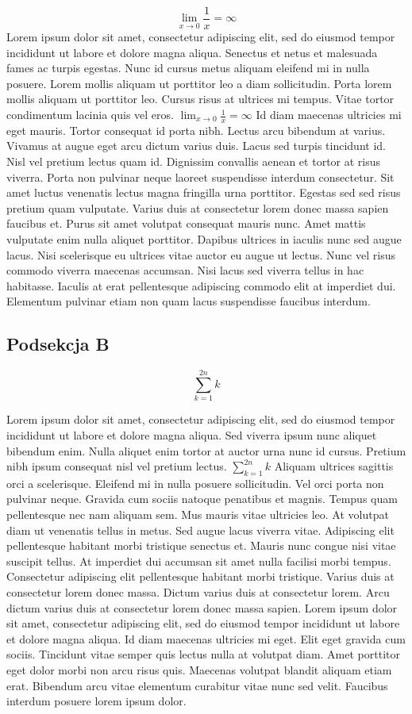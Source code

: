 \documentclass[12pt]{article}
\begin{document}
$$\lim_{x \to 0} \frac{1}{x} = \infty $$
Lorem ipsum dolor sit amet, consectetur adipiscing elit, sed do eiusmod tempor incididunt ut labore et dolore magna aliqua. Senectus et netus et malesuada fames ac turpis egestas. Nunc id cursus metus aliquam eleifend mi in nulla posuere. Lorem mollis aliquam ut porttitor leo a diam sollicitudin. Porta lorem mollis aliquam ut porttitor leo. Cursus risus at ultrices mi tempus. Vitae tortor condimentum lacinia quis vel eros. $\lim_{x \to 0} \frac{1}{x} = \infty $ Id diam maecenas ultricies mi eget mauris. Tortor consequat id porta nibh. Lectus arcu bibendum at varius. Vivamus at augue eget arcu dictum varius duis. Lacus sed turpis tincidunt id. Nisl vel pretium lectus quam id. Dignissim convallis aenean et tortor at risus viverra. Porta non pulvinar neque laoreet suspendisse interdum consectetur. Sit amet luctus venenatis lectus magna fringilla urna porttitor. Egestas sed sed risus pretium quam vulputate. Varius duis at consectetur lorem donec massa sapien faucibus et. Purus sit amet volutpat consequat mauris nunc. Amet mattis vulputate enim nulla aliquet porttitor. Dapibus ultrices in iaculis nunc sed augue lacus. Nisi scelerisque eu ultrices vitae auctor eu augue ut lectus. Nunc vel risus commodo viverra maecenas accumsan. Nisi lacus sed viverra tellus in hac habitasse. Iaculis at erat pellentesque adipiscing commodo elit at imperdiet dui. Elementum pulvinar etiam non quam lacus suspendisse faucibus interdum.


\subsection{Podsekcja B}
$$\sum_{k=1}^{2n} k $$

Lorem ipsum dolor sit amet, consectetur adipiscing elit, sed do eiusmod tempor incididunt ut labore et dolore magna aliqua. Sed viverra ipsum nunc aliquet bibendum enim. Nulla aliquet enim tortor at auctor urna nunc id cursus. Pretium nibh ipsum consequat nisl vel pretium lectus. $\sum_{k=1}^{2n} k $ Aliquam ultrices sagittis orci a scelerisque. Eleifend mi in nulla posuere sollicitudin. Vel orci porta non pulvinar neque. Gravida cum sociis natoque penatibus et magnis. Tempus quam pellentesque nec nam aliquam sem. Mus mauris vitae ultricies leo. At volutpat diam ut venenatis tellus in metus. Sed augue lacus viverra vitae. Adipiscing elit pellentesque habitant morbi tristique senectus et. Mauris nunc congue nisi vitae suscipit tellus. At imperdiet dui accumsan sit amet nulla facilisi morbi tempus. Consectetur adipiscing elit pellentesque habitant morbi tristique. Varius duis at consectetur lorem donec massa. Dictum varius duis at consectetur lorem. Arcu dictum varius duis at consectetur lorem donec massa sapien. Lorem ipsum dolor sit amet, consectetur adipiscing elit, sed do eiusmod tempor incididunt ut labore et dolore magna aliqua. Id diam maecenas ultricies mi eget. Elit eget gravida cum sociis. Tincidunt vitae semper quis lectus nulla at volutpat diam. Amet porttitor eget dolor morbi non arcu risus quis. Maecenas volutpat blandit aliquam etiam erat. Bibendum arcu vitae elementum curabitur vitae nunc sed velit. Faucibus interdum posuere lorem ipsum dolor.
\end{document}
